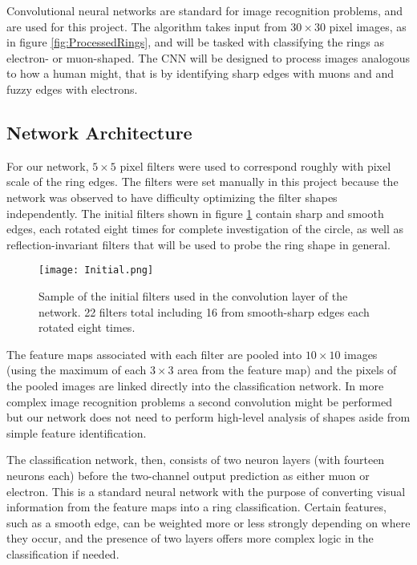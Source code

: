\documentclass[twoside,twocolumn]{article}
\begin{document}
Convolutional neural networks \cite{cite:CNN} are standard for image recognition problems, and are used for this project. The algorithm takes input from $30\times 30$ pixel images, as in figure \ref{fig:ProcessedRings}, and will be tasked with classifying the rings as electron- or muon-shaped. The CNN will be designed to process images analogous to how a human might, that is by identifying sharp edges with muons and and fuzzy edges with electrons.

\subsection{Network Architecture}

For our network, $5\times 5$ pixel filters were used to correspond roughly with pixel scale of the ring edges. The filters were set manually in this project because the network was observed to have difficulty optimizing the filter shapes independently. The initial filters shown in figure \ref{fig:Initial} contain sharp and smooth edges, each rotated eight times for complete investigation of the circle, as well as reflection-invariant filters that will be used to probe the ring shape in general. 

\begin{figure}[ht]
    \centering
    \texttt{[image: Initial.png]}
    \caption{Sample of the initial filters used in the convolution layer of the network. 22 filters total including 16 from smooth-sharp edges each rotated eight times.}
    \label{fig:Initial}
\end{figure}

The feature maps associated with each filter are pooled into $10\times 10$ images (using the maximum of each $3\times 3$ area from the feature map) and the pixels of the pooled images are linked directly into the classification network. In more complex image recognition problems a second convolution might be performed but our network does not need to perform high-level analysis of shapes aside from simple feature identification.

The classification network, then, consists of two neuron layers (with fourteen neurons each) before the two-channel output prediction as either muon or electron. This is a standard neural network with the purpose of converting visual information from the feature maps into a ring classification. Certain features, such as a smooth edge, can be weighted more or less strongly depending on where they occur, and the presence of two layers offers more complex logic in the classification if needed.
\end{document}
